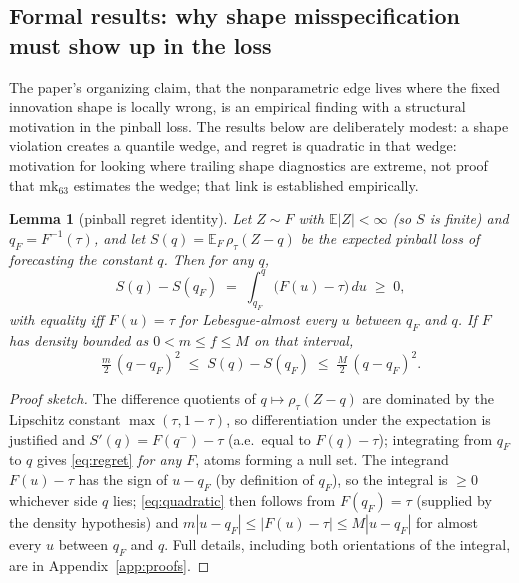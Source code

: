 \documentclass[11pt]{article}
\newtheorem{lemma}{Lemma}
\theoremstyle{remark}
\begin{document}
\subsection{Formal results: why shape misspecification must show up in
the loss}\label{sec:theory}

The paper's organizing claim, that the nonparametric edge lives where
the fixed innovation shape is locally wrong, is an empirical finding with a structural motivation in the pinball loss. The results
below are deliberately modest: a shape violation creates a quantile
wedge, and regret is quadratic in that wedge: motivation for looking where trailing shape diagnostics are extreme, not proof that
mk$_{63}$ estimates the wedge; that link is established empirically.

\begin{lemma}[pinball regret identity]\label{lem:regret}
Let $Z \sim F$ with $\mathbb{E}|Z| < \infty$ (so $S$ is finite) and
$q_F = F^{-1}(\tau)$, and let
$S(q) = \mathbb{E}_F\,\rho_\tau(Z - q)$ be the expected pinball loss of
forecasting the constant $q$. Then for any $q$,
\begin{equation}
S(q) - S(q_F) \;=\; \int_{q_F}^{q} \big(F(u) - \tau\big)\,du \;\ge\; 0,
\label{eq:regret}
\end{equation}
with equality iff $F(u) = \tau$ for Lebesgue-almost every $u$ between $q_F$ and $q$.
If $F$ has density bounded as $0 < m \le f \le M$ on that interval,
\begin{equation}
\tfrac{m}{2}\,(q - q_F)^2 \;\le\; S(q) - S(q_F) \;\le\;
\tfrac{M}{2}\,(q - q_F)^2 .
\label{eq:quadratic}
\end{equation}
\end{lemma}
\begin{proof}[Proof sketch]
The difference quotients of $q\mapsto\rho_\tau(Z-q)$ are dominated by
the Lipschitz constant $\max(\tau,1-\tau)$, so differentiation under the
expectation is justified and $S'(q)=F(q^-)-\tau$ (a.e.\ equal to
$F(q)-\tau$); integrating from $q_F$ to $q$ gives \eqref{eq:regret}
\emph{for any $F$}, atoms forming a null set. The integrand
$F(u)-\tau$ has the sign of $u-q_F$ (by definition of $q_F$), so the
integral is $\ge 0$ whichever side $q$ lies; \eqref{eq:quadratic} then
follows from $F(q_F)=\tau$ (supplied by the density hypothesis) and
$m|u-q_F|\le |F(u)-\tau|\le M|u-q_F|$ for almost every $u$ between
$q_F$ and $q$. Full details, including both
orientations of the integral, are in Appendix~\ref{app:proofs}.
\end{proof}
\end{document}
